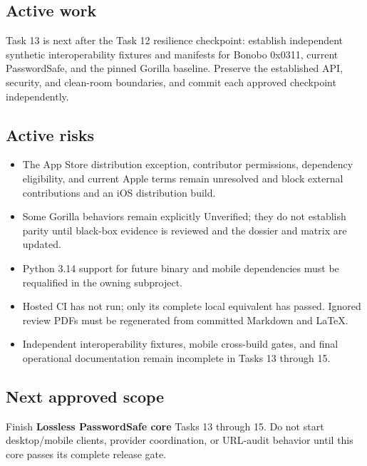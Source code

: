\documentclass[
  letterpaper,
]{article}
\providecommand{\tightlist}{%
  \setlength{\itemsep}{0pt}\setlength{\parskip}{0pt}}
\begin{document}
\subsection{Active work}\label{active-work}

Task 13 is next after the Task 12 resilience checkpoint: establish independent synthetic interoperability fixtures and
manifests for Bonobo 0x0311, current PasswordSafe, and the pinned Gorilla baseline. Preserve the established API,
security, and clean-room boundaries, and commit each approved checkpoint independently.

\subsection{Active risks}\label{active-risks}

\begin{itemize}
\tightlist
\item
  The App Store distribution exception, contributor permissions, dependency eligibility, and current Apple terms remain
  unresolved and block external contributions and an iOS distribution build.
\item
  Some Gorilla behaviors remain explicitly Unverified; they do not establish parity until black-box evidence is reviewed
  and the dossier and matrix are updated.
\item
  Python 3.14 support for future binary and mobile dependencies must be requalified in the owning subproject.
\item
  Hosted CI has not run; only its complete local equivalent has passed. Ignored review PDFs must be regenerated from
  committed Markdown and LaTeX.
\item
  Independent interoperability fixtures, mobile cross-build gates, and final operational documentation remain incomplete
  in Tasks 13 through 15.
\end{itemize}

\subsection{Next approved scope}\label{next-approved-scope}

Finish \textbf{Lossless PasswordSafe core} Tasks 13 through 15. Do not start desktop/mobile clients, provider
coordination, or URL-audit behavior until this core passes its complete release gate.
\end{document}
